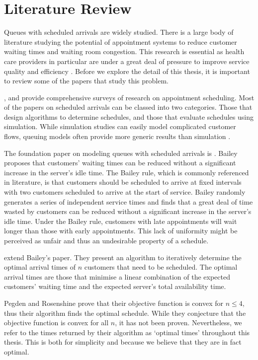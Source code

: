 \chapter{Literature Review}
Queues with scheduled arrivals are widely studied. There is a large body of literature studying the potential of appointment systems to reduce customer waiting times and waiting room congestion. This research is essential as health care providers in particular are under a great deal of pressure to improve service quality and efficiency \citep{Goldsmith}.  Before we explore the detail of this thesis, it is important to review some of the papers that study this problem.

\citet{Fomundam}, and \citet{Cayirli} provide comprehensive surveys of research on appointment scheduling. Most of the papers on scheduled arrivals can be classed into two categories. Those that design algorithms to determine schedules, and those that evaluate schedules using simulation. While simulation studies can easily model complicated customer flows, queuing models often provide more generic results than simulation \citep{Green}.

The foundation paper on modeling queues with scheduled arrivals is \citet{Bailey}. Bailey proposes that customers' waiting times can be reduced without a significant increase in the server's idle time. The Bailey rule, which is commonly referenced in literature, is that customers should be scheduled to arrive at fixed intervals with two customers scheduled to arrive at the start of service. Bailey randomly generates a series of independent service times and finds that a great deal of time wasted by customers can be reduced without a significant increase in the server's idle time. Under the Bailey rule, customers with late appointments will wait longer than those with early appointments. This lack of uniformity might be perceived as unfair and thus an undesirable property of a schedule. 

\citet{Pegden} extend Bailey's paper. They present an algorithm to iteratively determine the optimal arrival times of $n$ customers that need to be scheduled. The optimal arrival times are those that minimise a linear combination of the expected customers' waiting time and the expected server's total availability time.

Pegden and Rosenshine prove that their objective function is convex for $n \leq 4$, thus their algorithm finds the optimal schedule. While they conjecture that the objective function is convex for all $n$, it has not been proven. Nevertheless, we refer to the times returned by their algorithm as `optimal times' throughout this thesis. This is both for simplicity and because we believe that they are in fact optimal.

